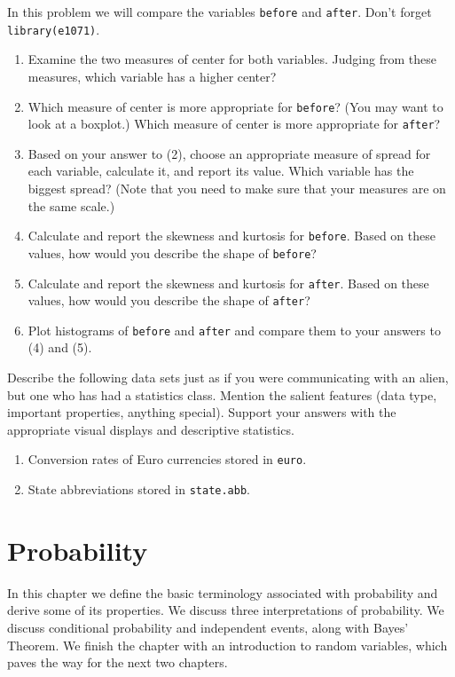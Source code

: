 \documentclass[captions=tableheading]{scrbook}
\begin{document}
\begin{xca}
In this problem we will compare the variables \texttt{before} and \texttt{after}. Don't forget \texttt{library(e1071)}.
\begin{enumerate}
\item Examine the two measures of center for both variables. Judging from these measures, which variable has a higher center?
\item Which measure of center is more appropriate for \texttt{before}? (You may want to look at a boxplot.) Which measure of center is more appropriate for \texttt{after}?
\item Based on your answer to (2), choose an appropriate measure of spread for each variable, calculate it, and report its value. Which variable has the biggest spread? (Note that you need to make sure that your measures are on the same scale.)
\item Calculate and report the skewness and kurtosis for \texttt{before}. Based on these values, how would you describe the shape of \texttt{before}?
\item Calculate and report the skewness and kurtosis for \texttt{after}. Based on these values, how would you describe the shape of \texttt{after}?
\item Plot histograms of \texttt{before} and \texttt{after} and compare them to your answers to (4) and (5).
\end{enumerate}
\end{xca}

\begin{xca}
Describe the following data sets just as if you were communicating with an alien, but one who has had a statistics class. Mention the salient features (data type, important properties, anything special). Support your answers with the appropriate visual displays and descriptive statistics.
\begin{enumerate}
\item Conversion rates of Euro currencies stored in \texttt{euro}.
\item State abbreviations stored in \texttt{state.abb}.
\end{enumerate}
\end{xca}
\chapter{Probability}
\label{sec-4}

\label{cha:Probability}


\noindent 
In this chapter we define the basic terminology associated with probability and derive some of its properties. We discuss three interpretations of probability. We discuss conditional probability and independent events, along with Bayes' Theorem. We finish the chapter with an introduction to random variables, which paves the way for the next two chapters.
\end{document}
